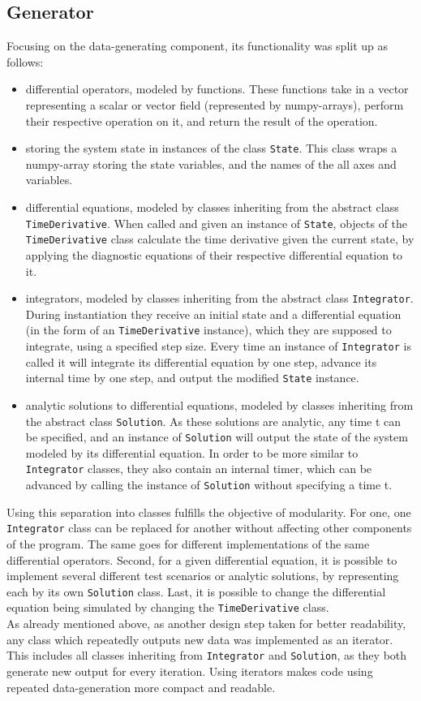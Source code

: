 \subsection*{Generator}
Focusing on the data-generating component, its functionality was split up as follows:
\begin{itemize}
\item differential operators, modeled by functions. 
These functions take in a vector representing a scalar or vector field (represented by numpy-arrays), perform their respective operation on it, and return the result of the operation.
\item storing the system state in instances of the class \texttt{State}.
This class wraps a numpy-array storing the state variables, and the names of the all axes and variables.
\item differential equations, modeled by classes inheriting from the abstract class \texttt{TimeDerivative}.
When called and given an instance of \texttt{State}, objects of the \texttt{TimeDerivative} class calculate the time derivative given the current state, by applying the diagnostic equations of their respective differential equation to it.
\item integrators, modeled by classes inheriting from the abstract class \texttt{Integrator}.
During instantiation they receive an initial state and a differential equation (in the form of an \texttt{TimeDerivative} instance), which they are supposed to integrate, using a specified step size.
Every time an instance of \texttt{Integrator} is called it will integrate its differential equation by one step, advance its internal time by one step, and output the modified \texttt{State} instance.
\item analytic solutions to differential equations, modeled by classes inheriting from the abstract class \texttt{Solution}.
As these solutions are analytic, any time t can be specified, and an instance of \texttt{Solution} will output the state of the system modeled by its differential equation.
In order to be more similar to \texttt{Integrator} classes, they also contain an internal timer, which can be advanced by calling the instance of \texttt{Solution} without specifying a time t.
\end{itemize}
Using this separation into classes fulfills the objective of modularity.
For one, one \texttt{Integrator} class can be replaced for another without affecting other components of the program.
The same goes for different implementations of the same differential operators.
Second, for a given differential equation, it is possible to implement several different test scenarios or analytic solutions, by representing each by its own \texttt{Solution} class.
Last, it is possible to change the differential equation being simulated by changing the \texttt{TimeDerivative} class.
\\
As already mentioned above, as another design step taken for better readability, any class which repeatedly outputs new data was implemented as an iterator.
This includes all classes inheriting from \texttt{Integrator} and \texttt{Solution}, as they both generate new output for every iteration.
Using iterators makes code using repeated data-generation more compact and readable.

